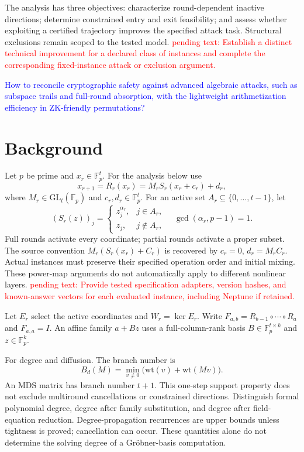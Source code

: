 \documentclass[conference]{IEEEtran}
\theoremstyle{definition}
\theoremstyle{plain}
\begin{document}
The analysis has three objectives: characterize round-dependent inactive
directions; determine constrained entry and exit feasibility; and assess
whether exploiting a certified trajectory improves the specified attack
task. Structural exclusions remain scoped to the tested model.
\textcolor{red}{pending text: Establish a distinct technical improvement
for a declared class of instances and complete the corresponding
fixed-instance attack or exclusion argument.}

\textcolor{blue}{How to reconcile cryptographic safety against advanced algebraic attacks, such as subspace trails and full-round absorption, with the lightweight arithmetization efficiency in ZK-friendly permutations?}


\section{Background}
\label{sec:background}
Let $p$ be prime and $x_r\in\mathbb F_p^t$. For the analysis below use
\begin{equation}
x_{r+1}=R_r(x_r)=M_rS_r(x_r+c_r)+d_r,
\label{eq:round}
\end{equation}
where $M_r\in\mathrm{GL}_t(\mathbb F_p)$ and $c_r,d_r\in\mathbb F_p^t$.
For an active set $A_r\subseteq\{0,\ldots,t-1\}$, let
\[
(S_r(z))_j=
\begin{cases}
z_j^{\alpha_r},&j\in A_r,\\
z_j,&j\notin A_r,
\end{cases}
\quad \gcd(\alpha_r,p-1)=1.
\]
Full rounds activate every coordinate; partial rounds activate a proper
subset. The source convention $M_r(S_r(x_r)+C_r)$ is recovered by
$c_r=0$, $d_r=M_rC_r$.
Actual instances must preserve their specified operation order and
initial mixing. These power-map arguments do not automatically apply to
different nonlinear layers.
\textcolor{red}{pending text: Provide tested specification adapters,
version hashes, and known-answer vectors for each evaluated instance,
including Neptune if retained.}

Let $E_r$ select the active coordinates and $W_r=\ker E_r$. Write
$F_{a,b}=R_{b-1}\circ\cdots\circ R_a$ and $F_{a,a}=I$.
An affine family $a+Bz$ uses a full-column-rank basis
$B\in\mathbb F_p^{t\times k}$ and $z\in\mathbb F_p^k$.

For degree and diffusion. The branch number is
\[
B_d(M)=\min_{v\ne0}\bigl(\mathrm{wt}(v)+\mathrm{wt}(Mv)\bigr).
\]
An MDS matrix has branch number $t+1$. This one-step support property
does not exclude multiround cancellations or constrained directions.
Distinguish formal polynomial degree, degree after family substitution,
and degree after field-equation reduction. Degree-propagation recurrences
are upper bounds unless tightness is proved; cancellation can occur.
These quantities alone do not determine the solving degree of a
Gr\"obner-basis computation.
\end{document}
